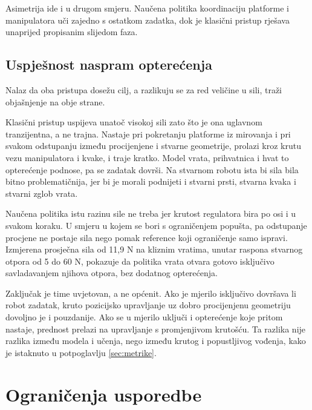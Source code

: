 Asimetrija ide i u drugom smjeru. Naučena politika koordinaciju platforme i manipulatora uči
zajedno s ostatkom zadatka, dok je klasični pristup rješava unaprijed propisanim slijedom faza.

\subsection{Uspješnost naspram opterećenja}

Nalaz da oba pristupa dosežu cilj, a razlikuju se za red veličine u sili, traži objašnjenje na
obje strane.

Klasični pristup uspijeva unatoč visokoj sili zato što je ona uglavnom tranzijentna, a ne
trajna. Nastaje pri pokretanju platforme iz mirovanja i pri svakom odstupanju između procijenjene
i stvarne geometrije, prolazi kroz krutu vezu manipulatora i kvake, i traje kratko. Model vrata,
prihvatnica i hvat to opterećenje podnose, pa se zadatak dovrši. Na stvarnom robotu ista bi sila
bila bitno problematičnija, jer bi je morali podnijeti i stvarni prsti, stvarna kvaka i stvarni
zglob vrata.

Naučena politika istu razinu sile ne treba jer krutost regulatora bira po osi i u svakom koraku.
U smjeru u kojem se bori s ograničenjem popušta, pa odstupanje procjene ne postaje sila nego
pomak reference koji ograničenje samo ispravi. Izmjerena prosječna sila od 11,9 N na kliznim
vratima, unutar raspona stvarnog otpora od 5 do 60 N, pokazuje da politika vrata otvara gotovo
isključivo savladavanjem njihova otpora, bez dodatnog opterećenja.

Zaključak je time uvjetovan, a ne općenit. Ako je mjerilo isključivo dovršava li robot zadatak,
kruto pozicijsko upravljanje uz dobro procijenjenu geometriju dovoljno je i pouzdanije. Ako se u
mjerilo uključi i opterećenje koje pritom nastaje, prednost prelazi na upravljanje s promjenjivom
krutošću. Ta razlika nije razlika između modela i učenja, nego između krutog i popustljivog
vođenja, kako je istaknuto u potpoglavlju \ref{sec:metrike}.

\section{Ograničenja usporedbe}
\label{sec:usporedba-limits}

